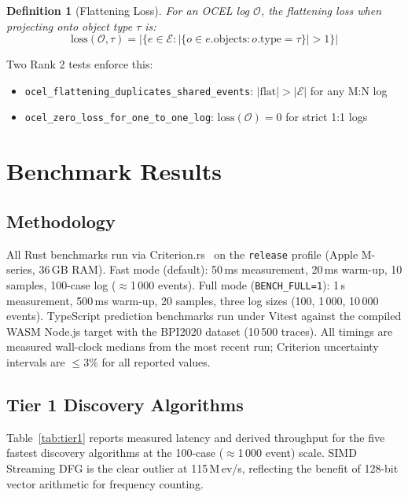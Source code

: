 \documentclass[12pt,a4paper]{article}
\newtheorem{definition}{Definition}
\begin{document}
\begin{definition}[Flattening Loss]
  For an OCEL log $\mathcal{O}$, the flattening loss when projecting onto object
  type $\tau$ is:
  \[ \text{loss}(\mathcal{O}, \tau) = |\{e \in \mathcal{E} : |\{o \in e.\text{objects} : o.\text{type} = \tau\}| > 1\}| \]
\end{definition}

Two Rank 2 tests enforce this:
\begin{itemize}
  \item \texttt{ocel\_flattening\_duplicates\_shared\_events}: $|\text{flat}| > |\mathcal{E}|$ for any M:N log
  \item \texttt{ocel\_zero\_loss\_for\_one\_to\_one\_log}: $\text{loss}(\mathcal{O}) = 0$ for strict 1:1 logs
\end{itemize}

\section{Benchmark Results}
\label{sec:benchmarks}

\subsection{Methodology}

All Rust benchmarks run via Criterion.rs~\cite{criterion} on the \texttt{release}
profile (Apple M-series, 36\,GB RAM). Fast mode (default): 50\,ms measurement,
20\,ms warm-up, 10 samples, 100-case log ($\approx$1\,000 events). Full mode
(\texttt{BENCH\_FULL=1}): 1\,s measurement, 500\,ms warm-up, 20 samples, three
log sizes (100, 1\,000, 10\,000 events). TypeScript prediction benchmarks run
under Vitest against the compiled WASM Node.js target with the BPI2020 dataset
(10\,500 traces). All timings are measured wall-clock medians from the most
recent run; Criterion uncertainty intervals are $\le 3\%$ for all reported values.

\subsection{Tier 1 Discovery Algorithms}

Table~\ref{tab:tier1} reports measured latency and derived throughput for the
five fastest discovery algorithms at the 100-case ($\approx$1\,000 event) scale.
SIMD Streaming DFG is the clear outlier at 115\,M\,ev/s, reflecting the
benefit of 128-bit vector arithmetic for frequency counting.
\end{document}
